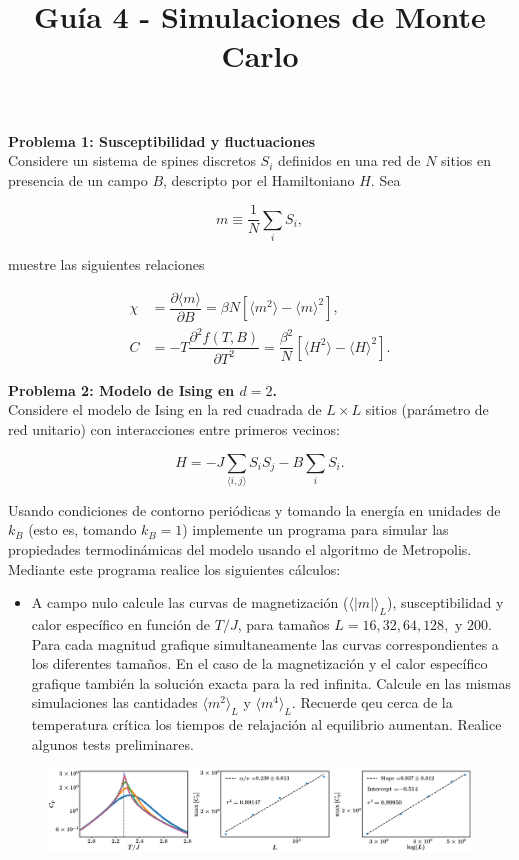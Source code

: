 \documentclass[10pt]{article}
\begin{document}
\title{Guía 4 - Simulaciones de Monte Carlo}

\maketitle

\textbf{Problema 1: Susceptibilidad y fluctuaciones}
\\

Considere un sistema de spines discretos $S_i$ definidos en una red de $N$ sitios en presencia de un campo $B$, descripto por el Hamiltoniano $H$. Sea

\begin{equation}
m \equiv \dfrac{1}{N} \sum_i S_i,
\end{equation}

muestre las siguientes relaciones

\begin{align}
\chi &= \dfrac{\partial \langle m \rangle}{\partial B} = \beta N \left[ \langle m^2 \rangle - \langle m \rangle^2 \right],\\
C &= -T \dfrac{\partial^2 f(T,B)}{\partial T^2} = \dfrac{\beta^2}{N} \left[ \langle H^2 \rangle - \langle H \rangle^2 \right].
\end{align}


\textbf{Problema 2: Modelo de Ising en $d = 2$.}
\\

Considere el modelo de Ising en la red cuadrada de $L \times L$ sitios (parámetro de red unitario) con interacciones entre primeros vecinos:

\begin{equation}
H = - J \sum_{\langle i,j\rangle} S_i S_j - B \sum_i S_i.
\end{equation}

Usando condiciones de contorno periódicas y tomando la energía en unidades de $k_B$ (esto es, tomando $k_B = 1$) implemente un programa para simular las propiedades termodinámicas del modelo usando el algoritmo de Metropolis. Mediante este programa realice los siguientes cálculos:

\begin{itemize}

\item A campo nulo calcule las curvas de magnetización ($\langle |m| \rangle_L$), susceptibilidad y calor específico en función de $T/J$, para tamaños $L = 16, 32, 64, 128, \text{ y } 200$. Para cada magnitud grafique simultaneamente las curvas correspondientes a los diferentes tamaños. En el caso de la magnetización y el calor específico grafique también la solución exacta para la red infinita. Calcule en las mismas simulaciones las cantidades $\langle m^2 \rangle_L$ y $\langle m^4 \rangle_L$. Recuerde qeu cerca de la temperatura crítica los tiempos de relajación al equilibrio aumentan. Realice algunos tests preliminares.


\end{itemize}

\begin{figure}
\includegraphics[scale=0.3]{Cp.png}
\end{figure}
\end{document}
